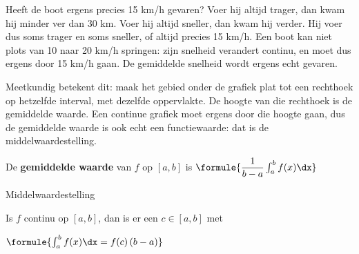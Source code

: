 Heeft de boot ergens precies 15 km/h gevaren? Voer hij altijd trager, dan kwam hij minder ver dan 30 km. Voer hij altijd sneller, dan kwam hij verder. Hij voer dus soms trager en soms sneller, of altijd precies 15 km/h. Een boot kan niet plots van 10 naar 20 km/h springen: zijn snelheid verandert continu, en moet dus ergens door 15 km/h gaan. De gemiddelde snelheid wordt ergens echt gevaren.

Meetkundig betekent dit: maak het gebied onder de grafiek plat tot een rechthoek op hetzelfde interval, met dezelfde oppervlakte. De hoogte van die rechthoek is de gemiddelde waarde. Een continue grafiek moet ergens door die hoogte gaan, dus de gemiddelde waarde is ook echt een functiewaarde: dat is de middelwaardestelling.

\begin{theorie}
De \textbf{\textcolor{accent}{gemiddelde waarde}} van $f$ op $[a, b]$ is \quad $\formule{\dfrac{1}{b-a}\int_a^b f(x)\dx}$

\begin{stelling}{Middelwaardestelling}
\begin{minipage}[t]{.62\linewidth}
\vspace{0pt}
Is $f$ continu op $[a, b]$, dan is er een $c \in [a, b]$ met

\vspace{1mm}
\qquad $\formule{\int_a^b f(x)\dx = f(c)\,(b-a)}$
\end{minipage}\hfill
\begin{minipage}[t]{.34\linewidth}
\vspace{0pt}
\end{minipage}
\end{stelling}


\end{theorie}
